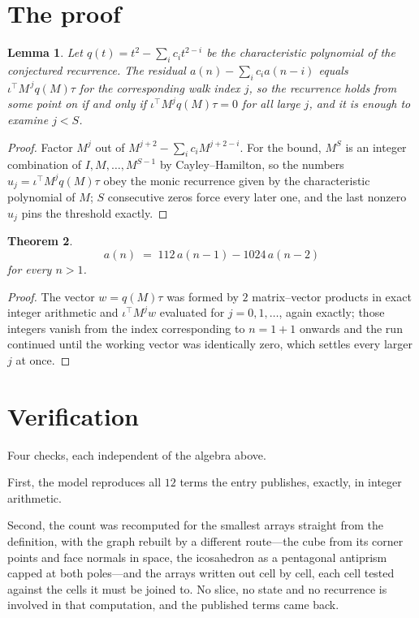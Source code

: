 \documentclass[11pt,a4paper]{article}
\theoremstyle{plain}
\newtheorem{theorem}{Theorem}
\newtheorem{lemma}[theorem]{Lemma}
\theoremstyle{definition}
\begin{document}
\section{The proof}

\begin{lemma}\label{lem:crit}
Let $q(t)=t^{2}-\sum_i c_it^{2-i}$ be the characteristic polynomial of the
conjectured recurrence. The residual $a(n)-\sum_ic_ia(n-i)$ equals
$\iota^{\!\top}M^{\,j}q(M)\tau$ for the corresponding walk index $j$, so the recurrence
holds from some point on if and only if $\iota^{\!\top}M^{j}q(M)\tau=0$ for all large $j$,
and it is enough to examine $j<S$.
\end{lemma}

\begin{proof}
Factor $M^{j}$ out of $M^{j+2}-\sum_ic_iM^{j+2-i}$. For the bound, $M^{S}$
is an integer combination of $I,M,\dots,M^{S-1}$ by Cayley--Hamilton, so the numbers
$u_j=\iota^{\!\top}M^{j}q(M)\tau$ obey the monic recurrence given by the characteristic
polynomial of $M$; $S$ consecutive zeros force every later one, and the last nonzero $u_j$
pins the threshold exactly.
\end{proof}

\begin{theorem}
\[
a(n)\;=\;112\,a(n-1) - 1024\,a(n-2)
\]
for every $n>1$.
\end{theorem}

\begin{proof}
The vector $w=q(M)\tau$ was formed by $2$ matrix--vector products in exact integer
arithmetic and $\iota^{\!\top}M^{j}w$ evaluated for $j=0,1,\dots$, again exactly; those
integers vanish from the index corresponding to $n=1+1$ onwards and the run continued
until the working vector was identically zero, which settles every larger $j$ at once.
\end{proof}

\section{Verification}

Four checks, each independent of the algebra above.

First, the model reproduces all $12$ terms the entry publishes, exactly, in integer
arithmetic.

Second, the count was recomputed for the smallest arrays straight from the definition, with the
graph rebuilt by a different route---the cube from its corner points and face normals in space,
the icosahedron as a pentagonal antiprism capped at both poles---and the arrays written out cell
by cell, each cell tested against the cells it must be joined to. No slice, no state and no
recurrence is involved in that computation, and the published terms came back.
\end{document}
